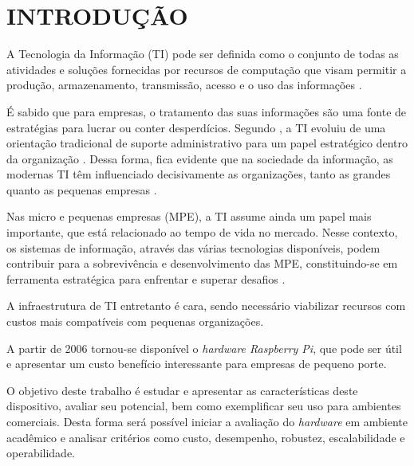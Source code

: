 \chapter{INTRODUÇÃO}

A Tecnologia da Informação (TI) pode ser definida como o conjunto de todas as atividades e soluções fornecidas por recursos de computação que visam permitir a produção, armazenamento, transmissão, acesso e o uso das informações \cite{WIKIPEDIA}.

É sabido que para empresas, o tratamento das suas informações são uma fonte de estratégias para lucrar ou conter desperdícios. Segundo , a TI evoluiu de uma orientação tradicional de suporte administrativo para um papel estratégico dentro da organização . Dessa forma, fica evidente que na sociedade da informação, as modernas TI têm influenciado decisivamente as organizações, tanto as grandes quanto as pequenas empresas \cite{CRISTINA}.

Nas micro e pequenas empresas (MPE), a TI assume ainda um papel mais importante, que está relacionado ao tempo de vida no mercado. Nesse contexto, os sistemas de informação, através das várias tecnologias disponíveis, podem contribuir para a sobrevivência e desenvolvimento das MPE, constituindo-se em ferramenta estratégica para enfrentar e superar desafios \cite{VALDIR}.

A infraestrutura de TI entretanto é cara, sendo necessário viabilizar recursos com custos mais compatíveis com pequenas organizações.

A partir de 2006 tornou-se disponível o \textit{hardware Raspberry Pi},  que pode ser útil e apresentar um custo benefício interessante para empresas de pequeno porte.

O objetivo deste trabalho é estudar e apresentar as características deste dispositivo, avaliar seu potencial, bem como exemplificar seu uso para ambientes comerciais. Desta forma será possível iniciar a avaliação do \textit{hardware} em ambiente acadêmico e analisar critérios como custo, desempenho, robustez, escalabilidade e operabilidade.